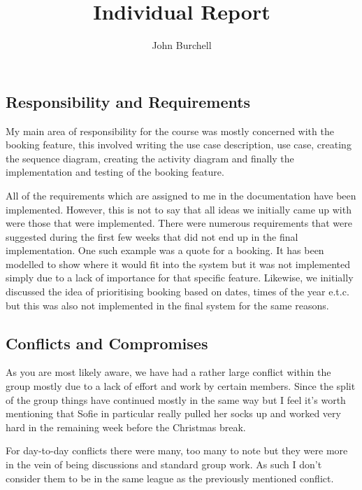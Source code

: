 \documentclass{article}
\begin{document}
\title{Individual Report}

\setlength{\parskip}{1em}

\author{John Burchell}
\maketitle

\subsection*{Responsibility and Requirements}

My main area of responsibility for the course was mostly concerned with the booking feature, this involved writing the use case description, use case, creating the sequence diagram, creating the activity diagram and finally the implementation and testing of the booking feature.
\par
All of the requirements which are assigned to me in the documentation have been implemented. However, this is not to say that all ideas we initially came up with were those that were implemented. There were numerous requirements that were suggested during the first few weeks that did not end up in the final implementation. One such example was a quote for a booking. It has been modelled to show where it would fit into the system but it was not implemented simply due to a lack of importance for that specific feature. Likewise, we initially discussed the idea of prioritising booking based on dates, times of the year e.t.c. but this was also not implemented in the final system for the same reasons.

\subsection*{Conflicts and Compromises}

As you are most likely aware, we have had a rather large conflict within the group mostly due to a lack of effort and work by certain members. Since the split of the group things have continued mostly in the same way but I feel it's worth mentioning that Sofie in particular really pulled her socks up and worked very hard in the remaining week before the Christmas break. 
\par
For day-to-day conflicts there were many, too many to note but they were more in the vein of being discussions and standard group work. As such I don't consider them to be in the same league as the previously mentioned conflict.
\end{document}
